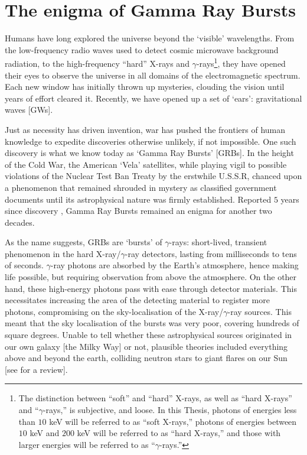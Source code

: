 \section{The enigma of Gamma Ray Bursts}
\label{sec:enigma}
Humans have long explored the universe beyond the `visible' wavelengths. From the low-frequency radio waves used to detect cosmic microwave background radiation, to the high-frequency ``hard'' X-rays and $\gamma$-rays\footnote{The distinction between ``soft'' and ``hard'' X-rays, as well as ``hard X-rays'' and ``$\gamma$-rays,'' is subjective, and loose. In this Thesis, photons of energies less than $10$ keV will be referred to as ``soft X-rays,'' photons of energies between $10$ keV and $200$ keV will be referred to as ``hard X-rays,'' and those with larger energies will be referred to as ``$\gamma$-rays.''},  they have opened their eyes to observe the universe in all domains of the electromagnetic spectrum. Each new window has initially thrown up mysteries, clouding the vision until years of effort cleared it. Recently, we have opened up a set of `ears': gravitational waves [GWs].

Just as necessity has driven invention, war has pushed the frontiers of human knowledge to expedite discoveries otherwise unlikely, if not impossible. One such discovery is what we know today as `Gamma Ray Bursts' [GRBs]. In the height of the Cold War, the American `Vela' satellites, while playing vigil to possible violations of the Nuclear Test Ban Treaty by the erstwhile U.S.S.R, chanced upon a phenomenon that remained shrouded in mystery as classified government documents until its astrophysical nature was firmly established. Reported $5$ years since discovery \citep{Klebesadel_et_al.-1973-ApJL}, Gamma Ray Bursts remained an enigma for another two decades.

As the name suggests, GRBs are `bursts' of $\gamma$-rays: short-lived, transient phenomenon in the hard X-ray/$\gamma$-ray detectors, lasting from milliseconds to tens of seconds. $\gamma$-ray photons are absorbed by the Earth's atmosphere, hence making life possible, but requiring observation from above the atmosphere. On the other hand, these high-energy photons pass with ease through detector materials. This necessitates increasing the area of the detecting material to register more photons, compromising on the sky-localisation of the X-ray/$\gamma$-ray sources. This meant that the sky localisation of the bursts was very poor, covering hundreds of square degrees. Unable to tell whether these astrophysical sources originated in our own galaxy [the Milky Way] or not, plausible theories included everything above and beyond the earth, colliding neutron stars to giant flares on our Sun [see \cite{Nemiroff-1994-review} for a review].

